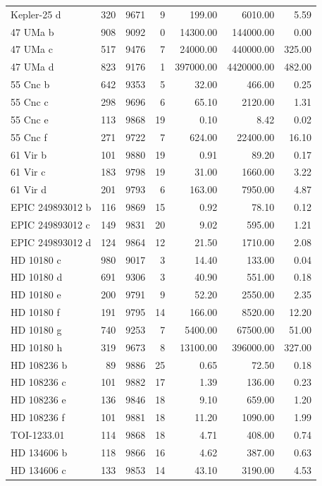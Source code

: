 \begin{table}
\begin{tabular}{lrrrrrr}
Kepler-25 d & 320 & 9671 & 9 & 199.00 & 6010.00 & 5.59 \\
47 UMa b & 908 & 9092 & 0 & 14300.00 & 144000.00 & 0.00 \\
47 UMa c & 517 & 9476 & 7 & 24000.00 & 440000.00 & 325.00 \\
47 UMa d & 823 & 9176 & 1 & 397000.00 & 4420000.00 & 482.00 \\
55 Cnc b & 642 & 9353 & 5 & 32.00 & 466.00 & 0.25 \\
55 Cnc c & 298 & 9696 & 6 & 65.10 & 2120.00 & 1.31 \\
55 Cnc e & 113 & 9868 & 19 & 0.10 & 8.42 & 0.02 \\
55 Cnc f & 271 & 9722 & 7 & 624.00 & 22400.00 & 16.10 \\
61 Vir b & 101 & 9880 & 19 & 0.91 & 89.20 & 0.17 \\
61 Vir c & 183 & 9798 & 19 & 31.00 & 1660.00 & 3.22 \\
61 Vir d & 201 & 9793 & 6 & 163.00 & 7950.00 & 4.87 \\
EPIC 249893012 b & 116 & 9869 & 15 & 0.92 & 78.10 & 0.12 \\
EPIC 249893012 c & 149 & 9831 & 20 & 9.02 & 595.00 & 1.21 \\
EPIC 249893012 d & 124 & 9864 & 12 & 21.50 & 1710.00 & 2.08 \\
HD 10180 c & 980 & 9017 & 3 & 14.40 & 133.00 & 0.04 \\
HD 10180 d & 691 & 9306 & 3 & 40.90 & 551.00 & 0.18 \\
HD 10180 e & 200 & 9791 & 9 & 52.20 & 2550.00 & 2.35 \\
HD 10180 f & 191 & 9795 & 14 & 166.00 & 8520.00 & 12.20 \\
HD 10180 g & 740 & 9253 & 7 & 5400.00 & 67500.00 & 51.00 \\
HD 10180 h & 319 & 9673 & 8 & 13100.00 & 396000.00 & 327.00 \\
HD 108236 b & 89 & 9886 & 25 & 0.65 & 72.50 & 0.18 \\
HD 108236 c & 101 & 9882 & 17 & 1.39 & 136.00 & 0.23 \\
HD 108236 e & 136 & 9846 & 18 & 9.10 & 659.00 & 1.20 \\
HD 108236 f & 101 & 9881 & 18 & 11.20 & 1090.00 & 1.99 \\
TOI-1233.01 & 114 & 9868 & 18 & 4.71 & 408.00 & 0.74 \\
HD 134606 b & 118 & 9866 & 16 & 4.62 & 387.00 & 0.63 \\
HD 134606 c & 133 & 9853 & 14 & 43.10 & 3190.00 & 4.53 \\

\end{tabular}
\end{table}
